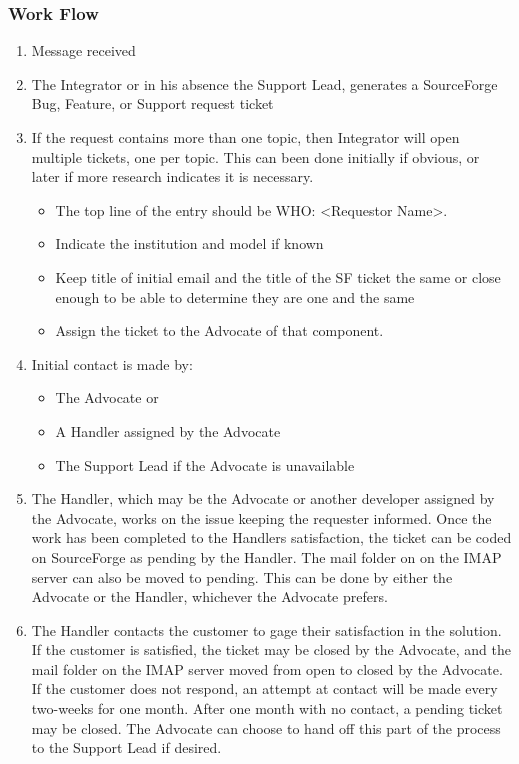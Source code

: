 \subsubsection{Work Flow}
\begin{enumerate}
\item Message received
\item The Integrator or in his absence the Support Lead, generates a SourceForge Bug, Feature, or Support request ticket
\item If the request contains more than one topic, then Integrator will open multiple tickets, one per topic. This can been done
initially if obvious, or later if more research indicates it is necessary. 

\begin{itemize}
\item The top line of the entry should be WHO: <Requestor Name>.
\item Indicate the institution and model if known
\item Keep title of initial email and the title of the SF ticket the
same or close enough to be able to determine they are one and the same
\item Assign the ticket to the Advocate of that component. 
\end{itemize}

\item Initial contact is made by:

\begin{itemize}
\item The Advocate or
\item A Handler assigned by the Advocate
\item The Support Lead if the Advocate is unavailable
\end{itemize}

\item The Handler, which may be the Advocate or another developer assigned by the Advocate, works on the issue keeping the requester informed. Once the work has been completed to the Handlers satisfaction, the ticket can be coded on SourceForge as pending by the Handler.  The mail folder on 
on the IMAP server can also be moved to pending. This can be done by either the Advocate or the Handler, whichever the Advocate prefers.

\item The Handler contacts the customer to gage their satisfaction in the solution. If the customer is satisfied, the ticket may be closed by the Advocate, and the mail folder on the IMAP server moved from open to 
closed by the Advocate.  If the customer does not respond, an attempt at contact will be made every two-weeks for one month.  After one month with no contact, a pending ticket may be closed. The Advocate can choose to hand off this part of the process to the Support Lead if desired. 
\end{enumerate}


